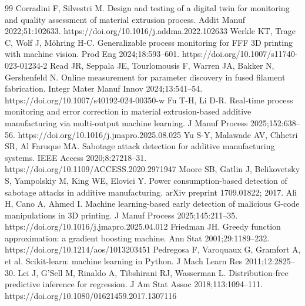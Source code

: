 \documentclass[10pt,a4paper,twocolumn]{article}
\begin{document}
\begin{thebibliography}{99}\fontsize{8}{9.5}\selectfont
\setlength{\itemsep}{1pt}
 Corradini F, Silvestri M. Design and testing of a digital twin for monitoring and quality assessment of material extrusion process. Addit Manuf 2022;51:102633. https://doi.org/10.1016/j.addma.2022.102633
 Werkle KT, Trage C, Wolf J, M{\"o}hring H-C. Generalizable process monitoring for FFF 3D printing with machine vision. Prod Eng 2024;18:593--601. https://doi.org/10.1007/s11740-023-01234-2
 Read JR, Seppala JE, Tourlomousis F, Warren JA, Bakker N, Gershenfeld N. Online measurement for parameter discovery in fused filament fabrication. Integr Mater Manuf Innov 2024;13:541--54. https://doi.org/10.1007/s40192-024-00350-w
 Fu T-H, Li D-R. Real-time process monitoring and error correction in material extrusion-based additive manufacturing via multi-output machine learning. J Manuf Process 2025;152:638--56. https://doi.org/10.1016/j.jmapro.2025.08.025
 Yu S-Y, Malawade AV, Chhetri SR, Al Faruque MA. Sabotage attack detection for additive manufacturing systems. IEEE Access 2020;8:27218--31. https://doi.org/10.1109/ACCESS.2020.2971947
 Moore SB, Gatlin J, Belikovetsky S, Yampolskiy M, King WE, Elovici Y. Power consumption-based detection of sabotage attacks in additive manufacturing. arXiv preprint 1709.01822; 2017.
 Ali H, Cano A, Ahmed I. Machine learning-based early detection of malicious G-code manipulations in 3D printing. J Manuf Process 2025;145:211--35. https://doi.org/10.1016/j.jmapro.2025.04.012
 Friedman JH. Greedy function approximation: a gradient boosting machine. Ann Stat 2001;29:1189--232. https://doi.org/10.1214/aos/1013203451
 Pedregosa F, Varoquaux G, Gramfort A, et al. Scikit-learn: machine learning in Python. J Mach Learn Res 2011;12:2825--30.
 Lei J, G'Sell M, Rinaldo A, Tibshirani RJ, Wasserman L. Distribution-free predictive inference for regression. J Am Stat Assoc 2018;113:1094--111. https://doi.org/10.1080/01621459.2017.1307116
\end{thebibliography}
\end{document}
